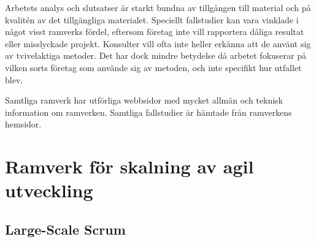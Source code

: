 		Arbetets analys och slutsatser är starkt bundna av tillgången till material och på kvalitén av det tillgängliga materialet. Speciellt fallstudier kan vara vinklade i något visst ramverks fördel, eftersom företag inte vill rapportera dåliga resultat eller misslyckade projekt. Konsulter vill ofta inte heller erkänna att de använt sig av tvivelaktiga metoder.
		Det har dock mindre betydelse då arbetet fokuserar på vilken sorts företag som använde sig av metoden, och inte specifikt hur utfallet blev.
		
		Samtliga ramverk har utförliga webbsidor med mycket allmän och teknisk information om ramverken. Samtliga fallstudier är hämtade från ramverkens hemsidor.
		
	
	
		
	
	
	
	
\newpage
\section{Ramverk för skalning av agil utveckling}
	
	
	\subsection{Large-Scale Scrum}
	
